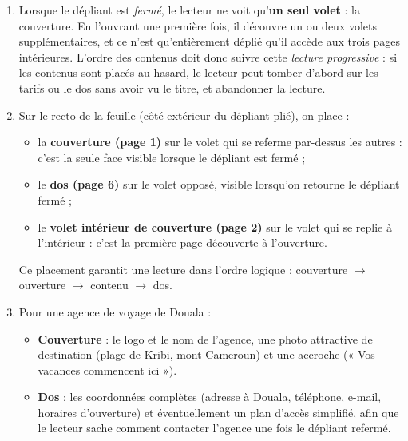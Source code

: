 \documentclass[11pt]{article}
\begin{document}
\begin{corrige}
\begin{enumerate}
\item Lorsque le dépliant est \emph{fermé}, le lecteur ne voit qu'\textbf{un seul volet} : la couverture. En l'ouvrant une première fois, il découvre un ou deux volets supplémentaires, et ce n'est qu'entièrement déplié qu'il accède aux trois pages intérieures. L'ordre des contenus doit donc suivre cette \emph{lecture progressive} : si les contenus sont placés au hasard, le lecteur peut tomber d'abord sur les tarifs ou le dos sans avoir vu le titre, et abandonner la lecture.
\item Sur le recto de la feuille (côté extérieur du dépliant plié), on place :
\begin{itemize}
\item la \textbf{couverture (page 1)} sur le volet qui se referme par-dessus les autres : c'est la seule face visible lorsque le dépliant est fermé ;
\item le \textbf{dos (page 6)} sur le volet opposé, visible lorsqu'on retourne le dépliant fermé ;
\item le \textbf{volet intérieur de couverture (page 2)} sur le volet qui se replie à l'intérieur : c'est la première page découverte à l'ouverture.
\end{itemize}
Ce placement garantit une lecture dans l'ordre logique : couverture $\rightarrow$ ouverture $\rightarrow$ contenu $\rightarrow$ dos.
\item Pour une agence de voyage de Douala :
\begin{itemize}
\item \textbf{Couverture} : le logo et le nom de l'agence, une photo attractive de destination (plage de Kribi, mont Cameroun) et une accroche (« Vos vacances commencent ici »).
\item \textbf{Dos} : les coordonnées complètes (adresse à Douala, téléphone, e-mail, horaires d'ouverture) et éventuellement un plan d'accès simplifié, afin que le lecteur sache comment contacter l'agence une fois le dépliant refermé.
\end{itemize}
\end{enumerate}
\end{corrige}
\end{document}
